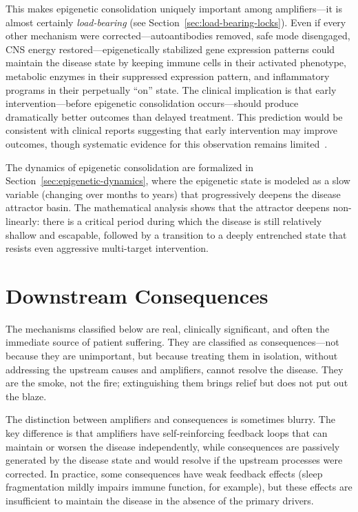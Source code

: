 This makes epigenetic consolidation uniquely important among amplifiers---it is almost certainly \emph{load-bearing} (see Section~\ref{sec:load-bearing-locks}). Even if every other mechanism were corrected---autoantibodies removed, safe mode disengaged, CNS energy restored---epigenetically stabilized gene expression patterns could maintain the disease state by keeping immune cells in their activated phenotype, metabolic enzymes in their suppressed expression pattern, and inflammatory programs in their perpetually ``on'' state. The clinical implication is that early intervention---before epigenetic consolidation occurs---should produce dramatically better outcomes than delayed treatment. This prediction would be consistent with clinical reports suggesting that early intervention may improve outcomes, though systematic evidence for this observation remains limited~\cite{Cairns2005prognosis,Lacourt2022prognosis}.

The dynamics of epigenetic consolidation are formalized in Section~\ref{sec:epigenetic-dynamics}, where the epigenetic state is modeled as a slow variable (changing over months to years) that progressively deepens the disease attractor basin. The mathematical analysis shows that the attractor deepens non-linearly: there is a critical period during which the disease is still relatively shallow and escapable, followed by a transition to a deeply entrenched state that resists even aggressive multi-target intervention.



\section{Downstream Consequences}
\label{sec:consequences}

The mechanisms classified below are real, clinically significant, and often the immediate source of patient suffering. They are classified as consequences---not because they are unimportant, but because treating them in isolation, without addressing the upstream causes and amplifiers, cannot resolve the disease. They are the smoke, not the fire; extinguishing them brings relief but does not put out the blaze.

The distinction between amplifiers and consequences is sometimes blurry. The key difference is that amplifiers have self-reinforcing feedback loops that can maintain or worsen the disease independently, while consequences are passively generated by the disease state and would resolve if the upstream processes were corrected. In practice, some consequences have weak feedback effects (sleep fragmentation mildly impairs immune function, for example), but these effects are insufficient to maintain the disease in the absence of the primary drivers.


